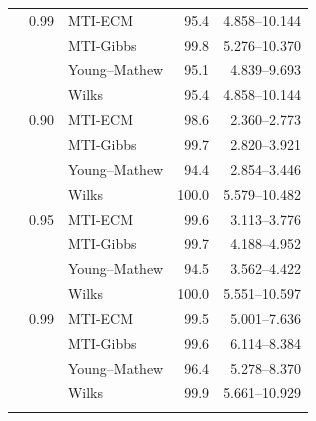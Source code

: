 \begin{longtable}{@{}rrlrr@{}}
\addlinespace[0.3em]
500 & 0.99 & MTI-ECM & 95.4 & 4.858--10.144 \\
 &  & MTI-Gibbs & 99.8 & 5.276--10.370 \\
 &  & Young--Mathew & 95.1 & 4.839--9.693 \\
 &  & Wilks & 95.4 & 4.858--10.144 \\
\addlinespace[0.3em]
1000 & 0.90 & MTI-ECM & 98.6 & 2.360--2.773 \\
 &  & MTI-Gibbs & 99.7 & 2.820--3.921 \\
 &  & Young--Mathew & 94.4 & 2.854--3.446 \\
 &  & Wilks & 100.0 & 5.579--10.482 \\
\addlinespace[0.3em]
1000 & 0.95 & MTI-ECM & 99.6 & 3.113--3.776 \\
 &  & MTI-Gibbs & 99.7 & 4.188--4.952 \\
 &  & Young--Mathew & 94.5 & 3.562--4.422 \\
 &  & Wilks & 100.0 & 5.551--10.597 \\
\addlinespace[0.3em]
1000 & 0.99 & MTI-ECM & 99.5 & 5.001--7.636 \\
 &  & MTI-Gibbs & 99.6 & 6.114--8.384 \\
 &  & Young--Mathew & 96.4 & 5.278--8.370 \\
 &  & Wilks & 99.9 & 5.661--10.929 \\
\addlinespace[0.3em]
\end{longtable}
\clearpage
